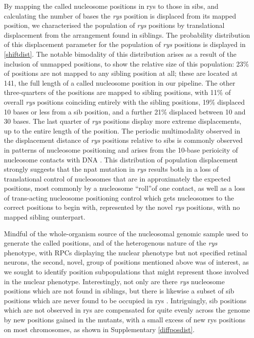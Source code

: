 By mapping the called nucleosome positions in rys to those in sibs, and calculating the number of bases the \textit{rys} position is displaced from its mapped position, we characterised the population of \textit{rys} positions by translational displacement from the arrangement found in siblings. The probability distribution of this displacement parameter for the population of \textit{rys} positions is displayed in \autoref{shiftdist}. The notable bimodality of this distribution arises as a result of the inclusion of unmapped positions, to show the relative size of this population: 23\% of positions are not mapped to any sibling position at all; these are located at 141, the full length of a called nucleosome position in our pipeline. The other three-quarters of the positions are mapped to sibling positions, with 11\% of overall \textit{rys} positions coinciding entirely with the sibling positions, 19\% displaced 10 bases or less from a sib position, and a further 21\% displaced between 10 and 30 bases. The last quarter of \textit{rys} positions display more extreme displacements, up to the entire length of the position. The periodic multimodality observed in the displacement distance of \textit{rys} positions relative to sibs is commonly observed in patterns of nucleosome positioning and arises from the 10-base perioicity of nucleosome contacts with DNA \cite{Wright2017}. This distribution of population displacement strongly suggests that the npat mutation in \textit{rys} results both in a loss of translational control of nucleosomes that are in approximately the expected positions, most commonly by a nucleosome ``roll''of one contact, as well as a loss of trans-acting nucleosome positioning control which gets nucleosomes to the correct positions to begin with, represented by the novel \textit{rys} positions, with no mapped sibling ounterpart.

Mindful of the whole-organism source of the nucleosomal genomic sample used to generate the called positions, and of the heterogenous nature of the \textit{rys} phenotype, with RPCs displaying the nuclear phenotype but not specified retinal neurons, the second, novel, group of positions mentioned above was of interest, as we sought to identify position subpopulations that might represent those involved in the nuclear phenotype. Interestingly, not only are there \textit{rys} nucleosome positions which are not found in siblings, but there is likewise a subset of sib positions which are never found to be occupied in rys . Intriguingly, sib positions which are not observed in rys are compensated for quite evenly across the genome by new positions gained in the mutants, with a small excess of new rys positions on most chromosomes, as shown in Supplementary \autoref{diffposdist}.

